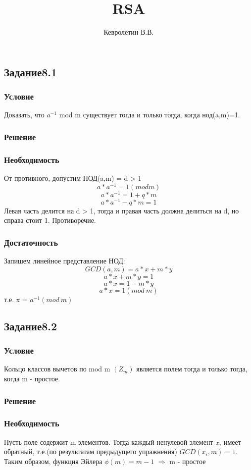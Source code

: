 \documentclass[10pt,a4paper]{article}
\author{Кевролетин В.В.}
\title{RSA}
\begin{document}
\maketitle

\subsection*{Задание8.1}
\subsubsection*{Условие}
Доказать, что $a^{-1}$ mod m существует тогда и только тогда, когда
нод(a,m)=1.
\subsubsection*{Решение}
\subsubsection*{Необходимость}
От противного, допустим  НОД(a,m) = d > 1
$$ a*a^{-1} = 1 (mod m) $$
$$ a*a^{-1} = 1 + q*m $$
$$ a*a^{-1} - q*m = 1 $$
Левая часть делится на d > 1, тогда и правая часть должна делиться на
d, но справа стоит 1. Противоречие.
\subsubsection*{Достаточность}
Запишем линейное представление НОД:
$$ GCD(a, m) = a*x + m*y $$
$$ a*x + m*y = 1 $$
$$ a*x = 1 - m*y $$
$$ a*x = 1 (mod\ m) $$
т.е. x = $a^{-1} (mod\ m)$

\subsection*{Задание8.2}
\subsubsection*{Условие}
Кольцо классов вычетов по mod m $(Z_m)$ является полем тогда и только
тогда, когда m - простое.
\subsubsection*{Решение}
\subsubsection*{Необходимость}
Пусть поле содержит m элементов. Тогда каждый ненулевой элемент $x_i$
имеет обратный, т.е.(по результатам предыдущего упражнения) $GCD(x_i,m)
= 1$. Таким образом, функция Эйлера 
$\phi (m) = m-1$ $\Rightarrow$ m - простое
\end{document}
